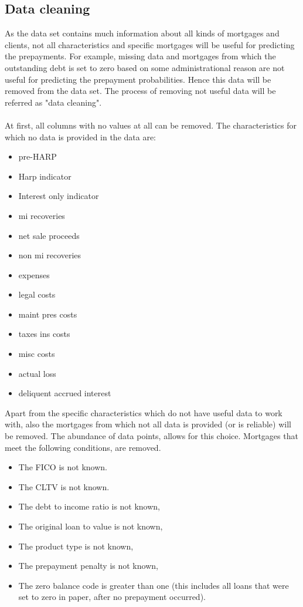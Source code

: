 \subsection{Data cleaning}
    As the data set contains much information about all kinds of mortgages 
    and clients, not all characteristics and specific mortgages will be 
    useful for predicting the prepayments. For example, missing data and 
    mortgages from which the outstanding debt is set to zero based on some 
    administrational reason are not useful for predicting the prepayment 
    probabilities. Hence this data will be removed from the data set. The 
    process of removing not useful data will be referred as "data cleaning". 
    \\\\  
    At first, all columns with no values at all can be removed. 
    The characteristics for which no data is provided in the data are: 
    \begin{itemize}
        \item pre-HARP
    	\item Harp indicator
    	\item Interest only indicator
        \item mi recoveries
        \item net sale proceeds
        \item non mi recoveries
        \item expenses
        \item legal costs
        \item maint pres costs
        \item taxes ins costs
        \item misc costs
        \item actual loss
        \item deliquent accrued interest
    \end{itemize}
    Apart from the specific characteristics which do not have useful data 
    to work with, also the mortgages from which not all data is provided
    (or is reliable) will be removed. The abundance of data points, allows for this choice.
    Mortgages that meet the following conditions, are removed. 
    \begin{itemize}
        \item The FICO is not known.
        \item The CLTV is not known.
        \item The debt to income ratio is not known, 
        \item The original loan to value is not known, 
        \item The product type is not known, 
        \item The prepayment penalty is not known, 
        \item The zero balance code is greater than one (this 
        includes all loans that were set to zero in paper, 
        after no prepayment occurred).  
    \end{itemize}
